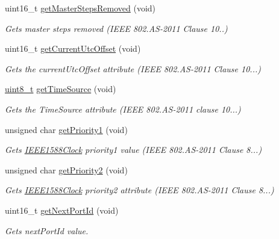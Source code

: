 \begin{DoxyCompactItemize}
uint16\+\_\+t \hyperlink{class_i_e_e_e1588_clock_a9f2faa0f0242047f72d8bcd97fa53de9}{get\+Master\+Steps\+Removed} (void)
\begin{DoxyCompactList}\small\item\em Gets master steps removed (I\+E\+EE 802.\+AS-\/2011 Clause 10..) \end{DoxyCompactList}\item 
uint16\+\_\+t \hyperlink{class_i_e_e_e1588_clock_a930a34747f52f093b0aacfd3cec5ad3d}{get\+Current\+Utc\+Offset} (void)
\begin{DoxyCompactList}\small\item\em Gets the current\+Utc\+Offset attribute (I\+E\+EE 802.\+AS-\/2011 Clause 10...) \end{DoxyCompactList}\item 
\hyperlink{stdint_8h_aba7bc1797add20fe3efdf37ced1182c5}{uint8\+\_\+t} \hyperlink{class_i_e_e_e1588_clock_a28eab05cb1e8228f86938ffd8a2ef5ef}{get\+Time\+Source} (void)
\begin{DoxyCompactList}\small\item\em Gets the Time\+Source attribute (I\+E\+EE 802.\+AS-\/2011 clause 10...) \end{DoxyCompactList}\item 
unsigned char \hyperlink{class_i_e_e_e1588_clock_a3577d05b0d34d976c23354585d7516ad}{get\+Priority1} (void)
\begin{DoxyCompactList}\small\item\em Gets \hyperlink{class_i_e_e_e1588_clock}{I\+E\+E\+E1588\+Clock} priority1 value (I\+E\+EE 802.\+AS-\/2011 Clause 8...) \end{DoxyCompactList}\item 
unsigned char \hyperlink{class_i_e_e_e1588_clock_a1a138f18bb886b11f49fa78d0b8bd24c}{get\+Priority2} (void)
\begin{DoxyCompactList}\small\item\em Gets \hyperlink{class_i_e_e_e1588_clock}{I\+E\+E\+E1588\+Clock} priority2 attribute (I\+E\+EE 802.\+AS-\/2011 Clause 8...) \end{DoxyCompactList}\item 
uint16\+\_\+t \hyperlink{class_i_e_e_e1588_clock_ae0903a133d46a64b196b69226a09f426}{get\+Next\+Port\+Id} (void)
\begin{DoxyCompactList}\small\item\em Gets next\+Port\+Id value. \end{DoxyCompactList}\item 

\end{DoxyCompactItemize}

